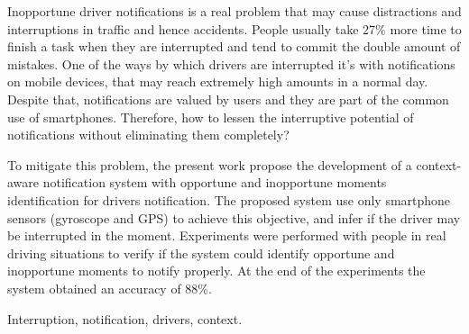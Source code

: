 Inopportune driver notifications is a real problem that may cause distractions and interruptions in traffic and
hence accidents. People usually take 27\% more time to finish a task when they are interrupted and tend to commit the
double amount of mistakes. One of the ways by which drivers are interrupted it's with notifications on mobile devices,
that may reach extremely high amounts in a normal day. Despite that, notifications are valued by users and they are
part of the common use of smartphones. Therefore, how to lessen the interruptive potential of notifications without
eliminating them completely?

To mitigate this problem, the present work propose the development of a context-aware notification system with opportune
and inopportune moments identification for drivers notification. The proposed system use only smartphone sensors (gyroscope
and GPS) to achieve this objective, and infer if the driver may be interrupted in the moment. Experiments were performed with
people in real driving situations to verify if the system could identify opportune and inopportune moments to notify properly.
At the end of the experiments the system obtained an accuracy of 88\%.

\begin{keywords}
Interruption, notification, drivers, context.
\end{keywords}
